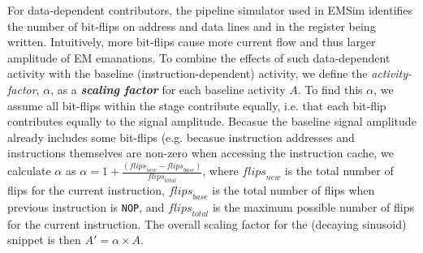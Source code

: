 For data-dependent contributors, the pipeline simulator used in EMSim identifies the number of bit-flips on address and data lines and in the register being written. Intuitively, more bit-flips cause more current flow and thus larger amplitude of EM emanations. To combine the effects of such data-dependent activity with the baseline (instruction-dependent) activity, we define the \textit{activity-factor}, $\alpha$, as a \textbf{\textit{scaling factor}} for each baseline activity $A$. To find this $\alpha$, we assume all bit-flips within the stage contribute equally, i.e. that each bit-flip contributes equally to the signal amplitude. Becasue the baseline signal amplitude already includes some bit-flips (e.g. becasue instruction addresses and instructions themselves are non-zero when accessing the instruction cache, we calculate $\alpha$ as $\alpha = 1 + \frac{(\mathit{flips}_{new} - \mathit{flips}_{base})}{\mathit{flips}_{total}}$, where $\mathit{flips}_{new}$ is the total number of flips for the current instruction,  $\mathit{flips}_{base}$ is the total number of flips when previous instruction is {\tt NOP}, and $\mathit{flips}_{total}$ is the maximum possible number of flips for the current instruction. The overall scaling factor for the (decaying sinusoid) snippet is then $A' = \alpha\times A$.

